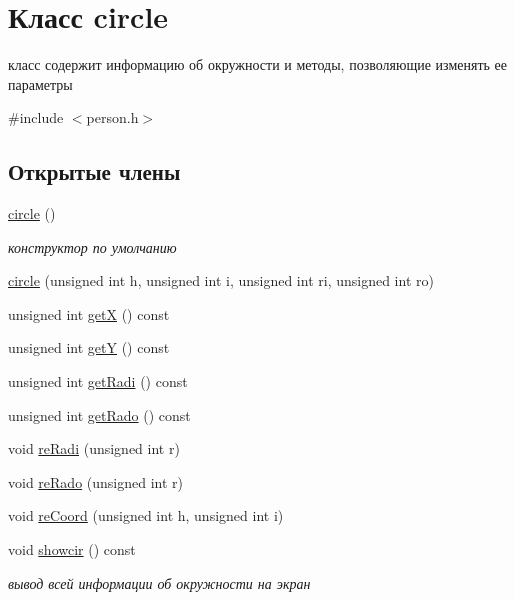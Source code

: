 \hypertarget{classcircle}{\section{Класс circle}
\label{classcircle}
}


класс содержит информацию об окружности и методы, позволяющие изменять ее параметры  




{\ttfamily \#include $<$person.\-h$>$}

\subsection*{Открытые члены}
\begin{DoxyCompactItemize}
\item 
\hyperlink{classcircle_a4e0786fc75051f3bbe5de2e08ef9712d}{circle} ()
\begin{DoxyCompactList}\small\item\em конструктор по умолчанию \end{DoxyCompactList}\item 
\hyperlink{classcircle_a814bce3e75dd5f5f84c2518ae51c1387}{circle} (unsigned int h, unsigned int i, unsigned int ri, unsigned int ro)
\item 
unsigned int \hyperlink{classcircle_acb03d8b165cd8119e0db27e3d1f25973}{get\-X} () const 
\item 
unsigned int \hyperlink{classcircle_ac9a1cb1a59361d4c8aa2cfe97be9cd6b}{get\-Y} () const 
\item 
unsigned int \hyperlink{classcircle_aee6a8fcac527547d0a31ac9a50a62f17}{get\-Radi} () const 
\item 
unsigned int \hyperlink{classcircle_a36b0477cc7924d8d25b8c8257e122f21}{get\-Rado} () const 
\item 
void \hyperlink{classcircle_a8e43044386d87854871f37820a430ad7}{re\-Radi} (unsigned int r)
\item 
void \hyperlink{classcircle_a0b56a3bf90443f021dc861ef21ce788b}{re\-Rado} (unsigned int r)
\item 
void \hyperlink{classcircle_a98edcf827c503e0259996abe32cb257e}{re\-Coord} (unsigned int h, unsigned int i)
\item 
void \hyperlink{classcircle_a41ac1ebe6a840fb68ea20ab9bb57be57}{showcir} () const 
\begin{DoxyCompactList}\small\item\em вывод всей информации об окружности на экран \end{DoxyCompactList}\end{DoxyCompactItemize}

